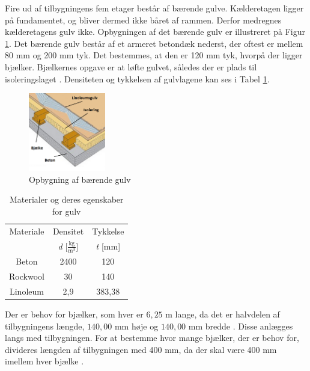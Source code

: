 Fire ud af tilbygningens fem etager består af bærende gulve. Kælderetagen ligger på fundamentet, og bliver dermed ikke båret af rammen. Derfor medregnes kælderetagens gulv ikke. 
\newline \indent{     }  Opbygningen af det bærende gulv er illustreret på Figur \ref{fig:gulv}. Det bærende gulv består af et armeret betondæk nederst, der oftest er mellem 80 mm og 200 mm tyk. Det bestemmes, at den er 120 mm tyk, hvorpå der ligger bjælker. Bjælkernes opgave er at løfte gulvet, således der er plads til isoleringslaget \citep{Gulvopbygning}. Densiteten og tykkelsen af gulvlagene kan ses i Tabel \ref{tab:densi}.

\begin{figure}[H]
	\centering
	\includegraphics[width=0.3\textwidth]{billeder/gulv.png}
	\caption{Opbygning af bærende gulv}
	\label{fig:gulv}
\end{figure}

\begin{table}
	\begin{center}
		\begin{tabular}{c c c}
			\hline
			Materiale & Densitet & Tykkelse \\
			& \textit{d} [$\frac{\text{kg}}{\text{m}^3}$] & \textit{t} [mm] \\ \hline
			Beton    & 2400     & 120      \\ 
			Rockwool & 30       & 140      \\ 
			Linoleum & 2,9      & 383,38  \\ 
		\end{tabular}
		\caption{Materialer og deres egenskaber for gulv}
		\label{tab:densi}
	\end{center}
\end{table}

Der er behov for bjælker, som hver er $6,\!25$ m lange, da det er halvdelen af tilbygningens længde, $140,\!00$ mm høje og $140,\!00$ mm bredde \citep{granse}. Disse anlægges langs med tilbygningen. For at bestemme hvor mange bjælker, der er behov for, divideres længden af tilbygningen med 400 mm, da der skal være 400 mm imellem hver bjælke \citep{Gulvopbygning}. 


